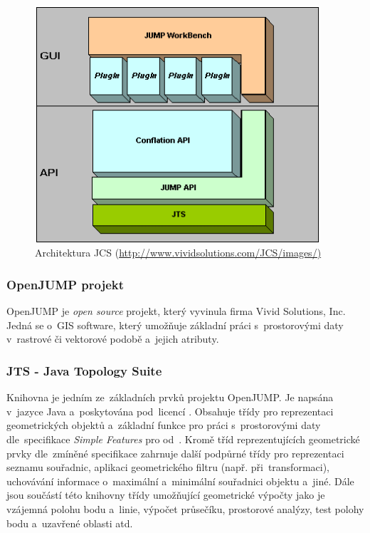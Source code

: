 \label{jcspic}
  \begin{figure}[H]
    \centering
      \includegraphics[width=300pt]{./pictures/JCS_Architecture.png}
      \caption{Architektura JCS 
	  (\url{http://www.vividsolutions.com/JCS/images/)}}
      \label{fig:architektura}
  \end{figure}


\subsubsection{OpenJUMP projekt}

OpenJUMP je \textit{open source} projekt, který vyvinula firma Vivid Solutions,
Inc. Jedná se o~GIS software, který umožňuje základní práci 
s~prostorovými daty v~rastrové či vektorové podobě a~jejich atributy.

\subsubsection{JTS - Java Topology Suite}
\label{jts}

Knihovna  je jedním ze~základních prvků projektu OpenJUMP.
Je napsána v~jazyce Java a~poskytována pod~licencí . Obsahuje třídy 
pro reprezentaci geometrických objektů a~základní funkce pro práci 
s~prostorovými daty dle~specifikace \textit{Simple Features} pro  
od~. Kromě tříd reprezentujících geometrické prvky dle~zmíněné
specifikace zahrnuje další podpůrné třídy pro reprezentaci seznamu souřadnic,
aplikaci geometrického filtru (např. při~transformaci), uchovávání informace
o~maximální a~minimální souřadnici objektu a~jiné. Dále jsou součástí této 
knihovny třídy umožňující geometrické výpočty jako je vzájemná polohu bodu 
a~linie, výpočet průsečíku, prostorové analýzy, test polohy bodu a~uzavřené
oblasti atd. 

